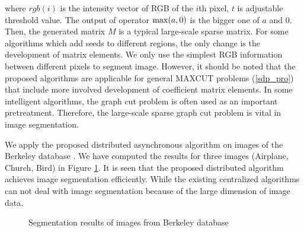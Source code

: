 \documentclass[journal]{IEEEtran}
\begin{document}
where $rgb(i)$ is the intensity vector of RGB of the $i$th pixel, $t$ is adjustable threshold value. The output of operator ${\rm max}(a,0)$ is the bigger one of $a$ and $0$. Then, the generated matrix $M$ is a typical large-scale sparse matrix. For some algorithms which add seeds to different regions, the only change is the development of matrix elements. We only use the simplest RGB information between different pixels to segment image. However, it should be noted that the proposed algorithms are applicable for general MAXCUT problems (\ref{sdp_pro}) that include more involved development of coefficient matrix elements. In some intelligent algorithms, the graph cut problem is often used as an important pretreatment\cite{contour_p}. Therefore, the large-scale sparse graph cut problem is vital in image segmentation.
\par We apply the proposed distributed asynchronous algorithm on images of the Berkeley database \cite{database}. We have computed the results for three images (Airplane, Church, Bird) in Figure \ref{image}. It is seen that the proposed distributed algorithm achieves image segmentation efficiently. While the existing centralized algorithms can not deal with image segmentation because of the large dimension of image data.
\begin{figure}[htbp]
	\centering
	
	
	\caption{Segmentation results of images from Berkeley database}
	\label{image}
\end{figure}
\end{document}
